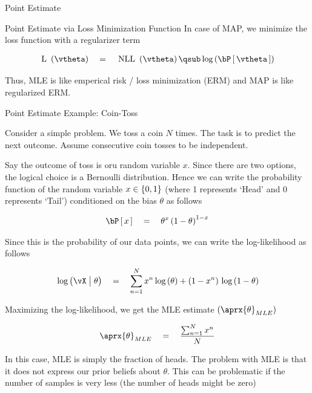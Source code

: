 \documentclass{article}
\begin{document}
\begin{ssection}{Point Estimate}
\begin{ssubsection}{Point Estimate via Loss Minimization Function}
		In case of MAP, we minimize the loss function with a regularizer term

		\begin{align*}
			\func{\mt{L}}{\vtheta}	\eq	\func{\mt{NLL}}{\vtheta} \qsub \log{\prob{\vtheta}}
		\end{align*}

		 \br

		Thus, MLE is like emperical risk / loss minimization (ERM) and MAP is like regularized ERM.

	\end{ssubsection}

	\begin{ssubsection}{Point Estimate Example: Coin-Toss}

		Consider a simple problem. We toss a coin $N$ times. The task is to predict the next outcome. Assume consecutive coin tosses to be independent. \br

		Say the outcome of toss is oru random variable $x$. Since there are two options, the logical choice is a Bernoulli distribution. Hence we can write the probability function of the random variable $x \in \left\{ {0, 1} \right\}$ (where 1 represents `Head' and 0 represents `Tail') conditioned on the bias $\theta$ as follows

		\begin{align*}
			\prob{x}	\eq	\theta^{x} \para{1 - \theta}^{1 - x}
		\end{align*}

		Since this is the probability of our data points, we can write the log-likelihood as follows

		\begin{align*}
			\log{\vX \pipe \theta}	\eq	\sum_{n = 1}^N x^n \log{\theta} + \para{1 - x^n} \log{1 - \theta}
		\end{align*}

		Maximizing the log-likelihood, we get the MLE estimate $\para{\aprx{\theta}_{MLE}}$

		\begin{align*}
			\aprx{\theta}_{MLE}	\eq	\frac{\sum_{n = 1}^N x^n}{N}
		\end{align*}

		In this case, MLE is simply the fraction of heads. The problem with MLE is that it does not express our prior beliefs about $\theta$. This can be problematic if the number of samples is very less (the number of heads might be zero) \br


\end{ssubsection}
\end{ssection}
\end{document}

